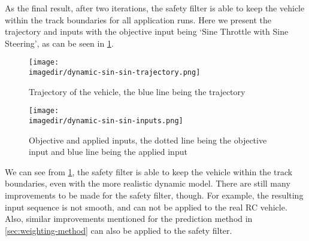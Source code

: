 As the final result, after two iterations, the safety filter is able to keep the vehicle within the track boundaries for all application runs.
Here we present the trajectory and inputs with the objective input being `Sine Throttle with Sine Steering', as can be seen in \cref{fig:dynamic-single-run}.


\begin{figure}[ht]
    \centering
    \texttt{[image: \\imagedir/dynamic-sin-sin-trajectory.png]}
    \caption{Trajectory of the vehicle, the blue line being the trajectory}
    \texttt{[image: \\imagedir/dynamic-sin-sin-inputs.png]}
    \caption{Objective and applied inputs, the dotted line being the objective input and blue line being the applied input}
    \label{fig:dynamic-single-run}
\end{figure}

We can see from \cref{fig:dynamic-single-run}, the safety filter is able to keep the vehicle within the track boundaries, even with the more realistic dynamic model.
There are still many improvements to be made for the safety filter, though.
For example, the resulting input sequence is not smooth, and can not be applied to the real RC vehicle.
Also, similar improvements mentioned for the prediction method in \cref{sec:weighting-method} can also be applied to the safety filter.
